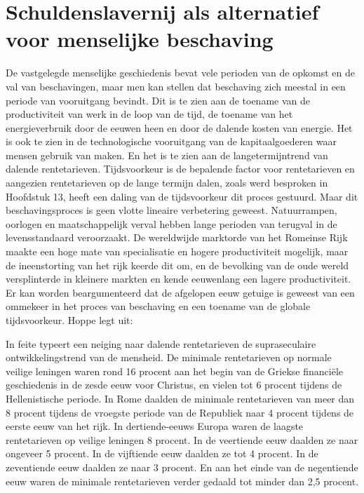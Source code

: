 \documentclass[
  a5paper,
  smalldemyvopaper,11pt,twoside,onecolumn,openright,extrafontsizes,
hidelinks]{memoir}
\begin{document}
\section{Schuldenslavernij als alternatief voor menselijke
beschaving}\label{schuldenslavernij-als-alternatief-voor-menselijke-beschaving}

De vastgelegde menselijke geschiedenis bevat vele perioden van de
opkomst en de val van beschavingen, maar men kan stellen dat beschaving
zich meestal in een periode van vooruitgang bevindt. Dit is te zien aan
de toename van de productiviteit van werk in de loop van de tijd, de
toename van het energieverbruik door de eeuwen heen en door de dalende
kosten van energie. Het is ook te zien in de technologische vooruitgang
van de kapitaalgoederen waar mensen gebruik van maken. En het is te zien
aan de langetermijntrend van dalende rentetarieven. Tijdsvoorkeur is de
bepalende factor voor rentetarieven en aangezien rentetarieven op de
lange termijn dalen, zoals werd besproken in Hoofdstuk 13, heeft een
daling van de tijdsvoorkeur dit proces gestuurd. Maar dit
beschavingsproces is geen vlotte lineaire verbetering geweest.
Natuurrampen, oorlogen en maatschappelijk verval hebben lange perioden
van terugval in de levensstandaard veroorzaakt. De wereldwijde marktorde
van het Romeinse Rijk maakte een hoge mate van specialisatie en hogere
productiviteit mogelijk, maar de ineenstorting van het rijk keerde dit
om, en de bevolking van de oude wereld versplinterde in kleinere markten
en kende eeuwenlang een lagere productiviteit. Er kan worden
beargumenteerd dat de afgelopen eeuw getuige is geweest van een ommekeer
in het proces van beschaving en een toename van de globale
tijdsvoorkeur. Hoppe legt uit:

In feite typeert een neiging naar dalende rentetarieven de
supraseculaire ontwikkelingstrend van de mensheid. De minimale
rentetarieven op normale veilige leningen waren rond 16 procent aan het
begin van de Griekse financiële geschiedenis in de zesde eeuw voor
Christus, en vielen tot 6 procent tijdens de Hellenistische periode. In
Rome daalden de minimale rentetarieven van meer dan 8 procent tijdens de
vroegste periode van de Republiek naar 4 procent tijdens de eerste eeuw
van het rijk. In dertiende-eeuws Europa waren de laagste rentetarieven
op veilige leningen 8 procent. In de veertiende eeuw daalden ze naar
ongeveer 5 procent. In de vijftiende eeuw daalden ze tot 4 procent. In
de zeventiende eeuw daalden ze naar 3 procent. En aan het einde van de
negentiende eeuw waren de minimale rentetarieven verder gedaald tot
minder dan 2,5 procent.
\end{document}
